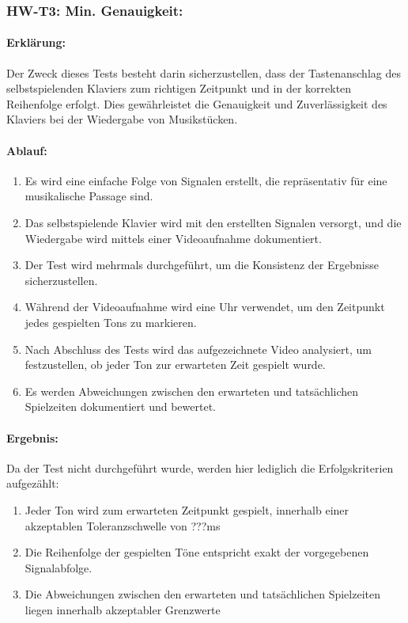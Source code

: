 \subsubsection{HW-T3: Min. Genauigkeit:}

\paragraph{Erklärung:}
Der Zweck dieses Tests besteht darin sicherzustellen, dass der Tastenanschlag des selbstspielenden Klaviers zum richtigen
Zeitpunkt und in der korrekten Reihenfolge erfolgt. Dies gewährleistet die Genauigkeit und Zuverlässigkeit des Klaviers
bei der Wiedergabe von Musikstücken.

\paragraph{Ablauf:}
\begin{enumerate}
	\item Es wird eine einfache Folge von Signalen erstellt, die repräsentativ für eine musikalische Passage sind.
	\item Das selbstspielende Klavier wird mit den erstellten Signalen versorgt, und die Wiedergabe wird mittels einer Videoaufnahme dokumentiert.
	\item Der Test wird mehrmals durchgeführt, um die Konsistenz der Ergebnisse sicherzustellen.
	\item Während der Videoaufnahme wird eine Uhr verwendet, um den Zeitpunkt jedes gespielten Tons zu markieren.
	\item Nach Abschluss des Tests wird das aufgezeichnete Video analysiert, um festzustellen, ob jeder Ton zur erwarteten Zeit gespielt wurde.
	\item Es werden Abweichungen zwischen den erwarteten und tatsächlichen Spielzeiten dokumentiert und bewertet.
\end{enumerate}

\paragraph{Ergebnis:}
Da der Test nicht durchgeführt wurde, werden hier lediglich die Erfolgskriterien aufgezählt:
\begin{enumerate}
	\item Jeder Ton wird zum erwarteten Zeitpunkt gespielt, innerhalb einer akzeptablen Toleranzschwelle von ???ms
	\item Die Reihenfolge der gespielten Töne entspricht exakt der vorgegebenen Signalabfolge.
	\item Die Abweichungen zwischen den erwarteten und tatsächlichen Spielzeiten liegen innerhalb akzeptabler Grenzwerte %
\end{enumerate}

